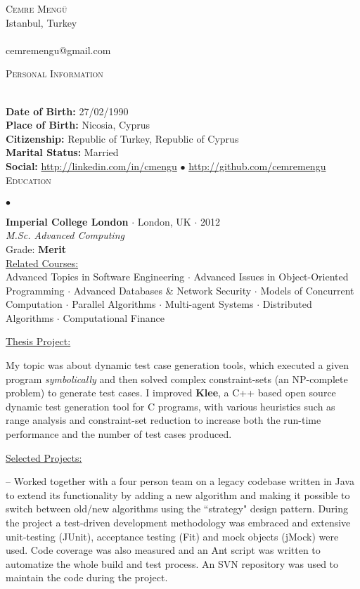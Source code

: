 \documentclass[11pt]{article}
\newcommand{\lineunder}{\vspace*{-8pt} \\ \hspace*{-18pt} \hrulefill \\}
\newcommand{\header}[1]{{\hspace*{-15pt}\vspace*{6pt} \textsc{#1}} \vspace*{-6pt} \lineunder}
\newcommand{\contact}[3]
{
  \vspace*{-8pt}
  \begin{center}
  {\LARGE \scshape {#1}}\\
  #2 \lineunder 
  #3
  \end{center}
  \vspace*{-8pt}
}
\newcommand{\schoolwithGPA}[6]
{
  \textbf{#1} 
  $\cdot$ #2 
  $\cdot$ #3 \\
  \emph{#4}\\ 
  Grade: \textbf{#5} \\ \vspace{2mm}
  \underline{Related Courses:} \\ \vspace{1mm} #6
  \vspace*{5pt}
}
\newcommand{\personal}[5]
{
   \textbf{Date of Birth:} #1 \\ \textbf{Place of Birth:} #2 \\ \textbf{Citizenship:} #3\\ 
   \textbf{Marital Status:} #4 \\ \textbf{Social:} #5 \\ 
}
\begin{document}
\small
\smallskip

\contact{Cemre Meng\"{u}}
{Istanbul, Turkey }
{cemremengu@gmail.com}

\header{Personal Information}
\vspace{1mm}

\personal{27/02/1990}{Nicosia, Cyprus}{Republic of Turkey, Republic of Cyprus}{Married}{ \url{http://linkedin.com/in/cmengu} $\bullet$ \url{http://github.com/cemremengu}}

\header{Education}
\vspace{1mm}
\hspace*{-12pt}$\bullet$
\schoolwithGPA{Imperial College London}{London, UK}{2012}{M.Sc. Advanced Computing}{Merit}
{Advanced Topics in Software Engineering $\cdot$ Advanced Issues in Object-Oriented Programming $\cdot$ Advanced Databases \& Network Security $\cdot$ Models of Concurrent Computation $\cdot$ Parallel Algorithms $\cdot$ Multi-agent Systems $\cdot$ Distributed Algorithms $\cdot$ Computational Finance}

\vspace{1mm} \underline{Thesis Project:} \\
\vspace{2mm}

My topic was about dynamic test case generation tools, which executed a given program \emph{symbolically} and then solved complex constraint-sets (an NP-complete problem) to generate test cases. I improved \textbf{Klee}, a C++ based open source dynamic test generation tool for C programs, with various heuristics such as range analysis and constraint-set reduction to  increase both the run-time performance and the number of test cases produced.

\vspace{3mm} \underline{Selected Projects:} \\

\vspace{2mm}

-- Worked together with a four person team on a legacy codebase written in Java to extend its functionality by adding a new algorithm and making it possible to switch between old/new algorithms using the ``strategy" design pattern.  During the project a test-driven development methodology was embraced and extensive unit-testing (JUnit), acceptance testing (Fit) and mock objects (jMock) were used. Code coverage was also measured and an Ant script was written to automatize the whole build and test process. An SVN repository was used to maintain the code during the project.
\end{document}
